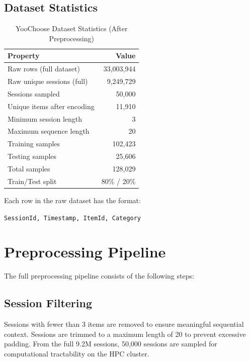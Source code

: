 \documentclass[12pt,a4paper]{report}
\begin{document}
\subsection{Dataset Statistics}

\begin{table}[H]
\centering
\caption{YooChoose Dataset Statistics (After Preprocessing)}
\begin{tabular}{lr}
\toprule
\textbf{Property} & \textbf{Value} \\
\midrule
Raw rows (full dataset)         & 33,003,944 \\
Raw unique sessions (full)      & 9,249,729  \\
Sessions sampled                & 50,000     \\
Unique items after encoding     & 11,910     \\
Minimum session length          & 3          \\
Maximum sequence length         & 20         \\
Training samples                & 102,423    \\
Testing samples                 & 25,606     \\
Total samples                   & 128,029    \\
Train/Test split                & 80\% / 20\% \\
\bottomrule
\end{tabular}
\label{tab:dataset}
\end{table}

Each row in the raw dataset has the format:
\begin{center}
\texttt{SessionId, Timestamp, ItemId, Category}
\end{center}

\section{Preprocessing Pipeline}

The full preprocessing pipeline consists of the following steps:

\subsection{Session Filtering}

Sessions with fewer than 3 items are removed to ensure meaningful sequential
context. Sessions are trimmed to a maximum length of 20 to prevent excessive
padding. From the full 9.2M sessions, 50,000 sessions are sampled for
computational tractability on the HPC cluster.
\end{document}
